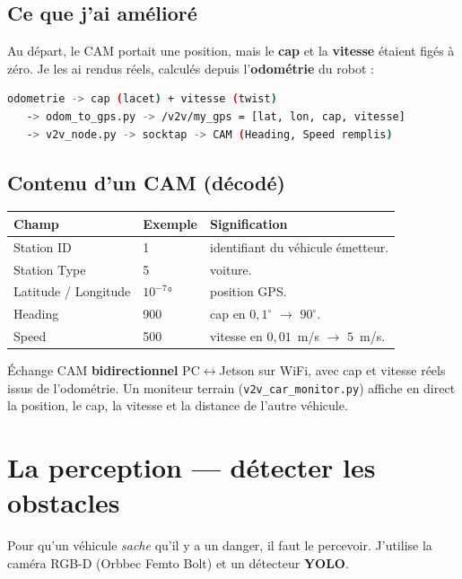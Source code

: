 \documentclass[a4paper,11pt]{article}
\newcommand{\code}[1]{\texttt{#1}}
\begin{document}
\subsection{Ce que j'ai amélioré}
Au départ, le CAM portait une position, mais le \textbf{cap} et la \textbf{vitesse} étaient
figés à zéro. Je les ai rendus réels, calculés depuis l'\textbf{odométrie} du robot :
\begin{lstlisting}[language=bash]
odometrie -> cap (lacet) + vitesse (twist)
   -> odom_to_gps.py -> /v2v/my_gps = [lat, lon, cap, vitesse]
   -> v2v_node.py -> socktap -> CAM (Heading, Speed remplis)
\end{lstlisting}

\subsection{Contenu d'un CAM (décodé)}
\begin{center}
\begin{tabularx}{\textwidth}{@{}l l X@{}}
\toprule
\textbf{Champ} & \textbf{Exemple} & \textbf{Signification} \\
\midrule
Station ID & 1 & identifiant du véhicule émetteur. \\
Station Type & 5 & voiture. \\
Latitude / Longitude & $10^{-7}$° & position GPS. \\
Heading & 900 & cap en $0{,}1^\circ$ $\rightarrow$ $90^\circ$. \\
Speed & 500 & vitesse en $0{,}01$~m/s $\rightarrow$ $5$~m/s. \\
\bottomrule
\end{tabularx}
\end{center}

\begin{note}[Vérifié]
Échange CAM \textbf{bidirectionnel} PC$\leftrightarrow$Jetson sur WiFi, avec cap et vitesse
réels issus de l'odométrie. Un moniteur terrain (\code{v2v\_car\_monitor.py}) affiche en
direct la position, le cap, la vitesse et la distance de l'autre véhicule.
\end{note}

\section{La perception --- détecter les obstacles}
Pour qu'un véhicule \emph{sache} qu'il y a un danger, il faut le percevoir. J'utilise la
caméra RGB-D (Orbbec Femto Bolt) et un détecteur \textbf{YOLO}.
\end{document}
